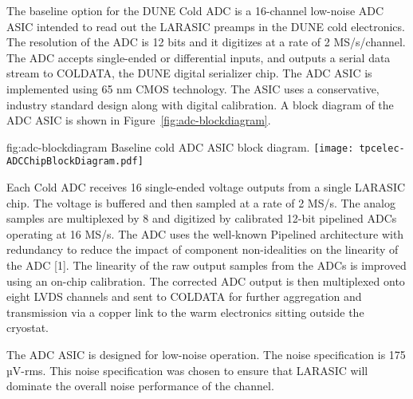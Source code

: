 The baseline option for the DUNE Cold ADC is a 16-channel low-noise ADC ASIC intended to read out the LARASIC preamps in the DUNE cold electronics. The resolution of the ADC is 12 bits and it digitizes at a rate of 2 MS/s/channel. The ADC accepts single-ended or differential inputs, and outputs a serial data stream to COLDATA, the DUNE digital serializer chip. The ADC ASIC is implemented using 65 nm CMOS technology. The ASIC uses a conservative, industry standard design along with digital calibration. A block diagram of the ADC ASIC is shown in Figure~\ref{fig:adc-blockdiagram}.

\begin{dunefigure}
{fig:adc-blockdiagram}
{Baseline cold ADC ASIC block diagram.}
\texttt{[image: tpcelec-ADCChipBlockDiagram.pdf]}
\end{dunefigure}

Each Cold ADC receives 16 single-ended voltage outputs from a single LARASIC chip. The voltage is buffered and then sampled at a rate of 2 MS/s. The analog samples are multiplexed by 8 and digitized by calibrated 12-bit pipelined ADCs operating at 16 MS/s. The ADC uses the well-known Pipelined architecture with redundancy to reduce the impact of component non-idealities on the linearity of the ADC [1]. The linearity of the raw output samples from the ADCs is improved using an on-chip calibration. The corrected ADC output is then multiplexed onto eight LVDS channels and sent to COLDATA for further aggregation and transmission via a copper link to the warm electronics sitting outside the cryostat.

The ADC ASIC is designed for low-noise operation. The noise specification is 175 µV-rms. This noise specification was chosen to ensure that LARASIC will dominate the overall noise performance of the channel.

